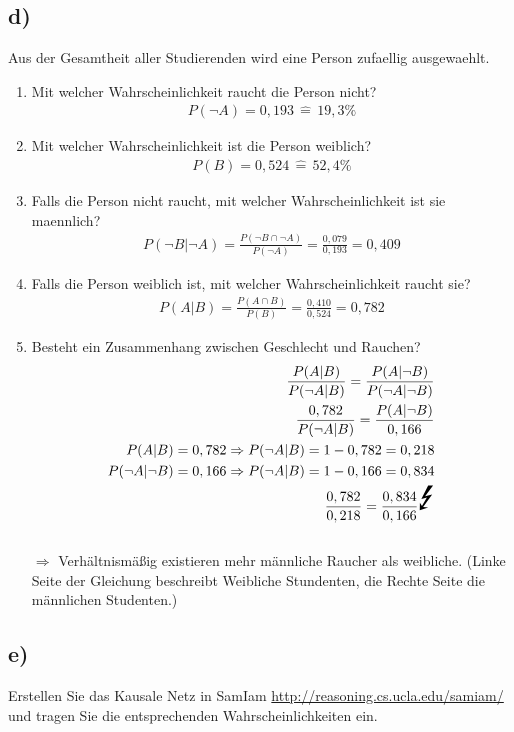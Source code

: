 \documentclass[12pt, a4paper]{article}
\begin{document}
\subsection*{d)}
Aus der Gesamtheit aller Studierenden wird eine Person zufaellig ausgewaehlt.
\begin{enumerate}
\item Mit welcher Wahrscheinlichkeit raucht die Person nicht?\\
\begin{align}
P(\neg A) = 0,193 \, \widehat{=} \, 19,3\%
\end{align}
\item Mit welcher Wahrscheinlichkeit ist die Person weiblich?
\begin{align}
P(B) = 0,524 \, \widehat{=} \, 52,4\%
\end{align}
\item Falls die Person nicht raucht, mit welcher Wahrscheinlichkeit ist sie maennlich?
\begin{align}
P(\neg B | \neg A) = \frac{P(\neg B \cap \neg A)}{P(\neg A)} = \frac{0,079}{0,193} = 0,409
\end{align}
\item Falls die Person weiblich ist, mit welcher Wahrscheinlichkeit raucht sie?
\begin{align}
P(A | B) = \frac{P(A \cap B)}{P(B)} = \frac{0,410}{0,524} = 0,782
\end{align}
\item Besteht ein Zusammenhang zwischen Geschlecht und Rauchen?
\begin{align}
\frac{P(A | B)}{P(\neg A | B)} = \frac{P(A | \neg B)}{P(\neg A | \neg B)} \\
\frac{0,782}{P(\neg A | B)} = \frac{P(A | \neg B)}{0,166}
\\
P(A | B) = 0,782 \Rightarrow P(\neg A | B) = 1 - 0,782 = 0,218
\\
P(\neg A | \neg B) = 0,166 \Rightarrow P(\neg A | B) = 1 - 0,166 = 0,834
\\
\frac{0,782}{0,218} = \frac{0,834}{0,166}
\text{\Huge{\Lightning}}
\end{align}
\\
$\Rightarrow$ Verhältnismäßig existieren mehr männliche Raucher als weibliche. (Linke Seite der Gleichung beschreibt Weibliche Stundenten, die Rechte Seite die männlichen Studenten.)
\end{enumerate}
\subsection*{e)}
Erstellen Sie das Kausale Netz in SamIam \url{http://reasoning.cs.ucla.edu/samiam/} und tragen Sie die entsprechenden Wahrscheinlichkeiten ein.
\vspace{0.3cm}
\end{document}
